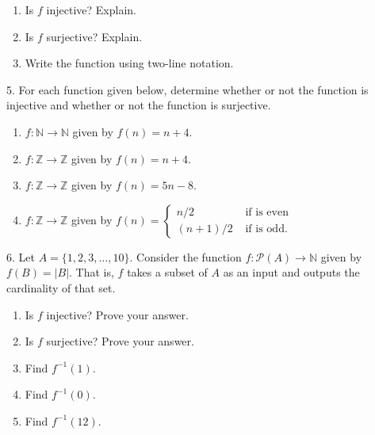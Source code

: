 \documentclass[10pt,]{book}
\theoremstyle{plain}
\theoremstyle{definition}
\numberwithin{equation}{chapter}
\def\N{\mathbb N}
\def\Z{\mathbb Z}
\def\pow{\mathcal P}
\def\inv{^{-1}}
\newcommand{\amp}{ & }
\begin{document}
\begin{exerciselist}
          \leavevmode%
\begin{enumerate}[label=(\alph*)]
\item\hypertarget{li-130}{}
                Is \(f\) injective? Explain.
\item\hypertarget{li-131}{}
                Is \(f\) surjective? Explain.
\item\hypertarget{li-132}{}
                Write the function using two-line notation.
\end{enumerate}

\par\smallskip
\item[5.]\hypertarget{exercise-31}{}
            For each function given below, determine whether or not the function is injective and whether or not the function is surjective.
          \leavevmode%
\begin{enumerate}[label=(\alph*)]
\item\hypertarget{li-133}{}\(f:\N \to \N\) given by \(f(n) = n+4\).%
\item\hypertarget{li-134}{}\(f:\Z \to \Z\) given by \(f(n) = n+4\).%
\item\hypertarget{li-135}{}\(f:\Z \to \Z\) given by \(f(n) = 5n - 8\).%
\item\hypertarget{li-136}{}\(f:\Z \to \Z\) given by \(f(n) = \begin{cases}n/2 \amp  \mbox{ if  is even} \\ (n+1)/2 \amp \mbox{ if  is odd} . \end{cases}
              \)%
\end{enumerate}

\par\smallskip
\item[6.]\hypertarget{exercise-32}{}
            Let \(A = \{1,2,3,\ldots,10\}\). Consider the function \(f:\pow(A) \to \N\) given by \(f(B) = |B|\). That is, \(f\) takes a subset of \(A\) as an input and outputs the cardinality of that set.
          \leavevmode%
\begin{enumerate}[label=(\alph*)]
\item\hypertarget{li-141}{}
                Is \(f\) injective? Prove your answer.
\item\hypertarget{li-142}{}
                Is \(f\) surjective? Prove your answer.
\item\hypertarget{li-143}{}
                Find \(f\inv(1)\).
\item\hypertarget{li-144}{}
                Find \(f\inv(0)\).
\item\hypertarget{li-145}{}
                Find \(f\inv(12)\).
\end{enumerate}


\end{exerciselist}
\end{document}
